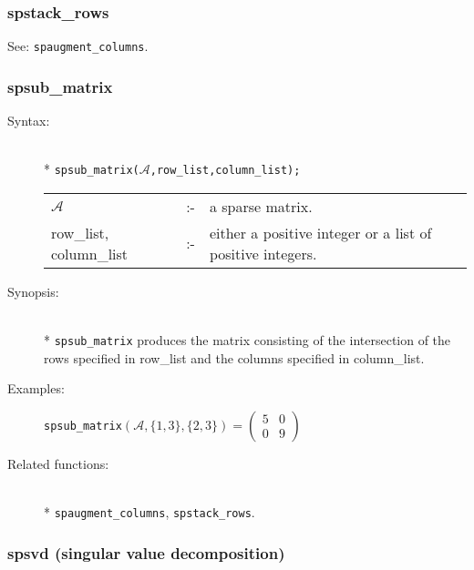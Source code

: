 \subsubsection{spstack\_rows}
\label{sparse:spstack_rows}
\hypertarget{operator:SPSTACK_ROWS}{}

See: \texttt{spaugment\_columns}.


\subsubsection{spsub\_matrix}
\label{sparse:spsub_matrix}
\hypertarget{operator:SPSUB_MATRIX}{}

\begin{description}
\item[Syntax:]\mbox{}\\*
\texttt{spsub\_matrix($\mathcal{A}$,row\_list,column\_list);}\\[2mm]
\begin{tabular}{l l l}
$\mathcal{A}$              &:-& a sparse matrix. \\
row\_list, column\_list &:-& \parbox[t]{.605\linewidth}{either a
positive integer or a list of positive integers.}
\end{tabular}

\item[Synopsis:]\mbox{}\\*
\texttt{spsub\_matrix} produces the matrix consisting of the
              intersection of the rows specified in row\_list and the
columns specified in column\_list.

\item[Examples:]
\hspace*{0.1in}
\texttt{spsub\_matrix}\((\mathcal{A},\{1,3\},\{2,3\}) =
        \begin{pmatrix} 5 & 0\\ 0 & 9 \end{pmatrix}\)

\item[Related functions:]\mbox{}\\*
\texttt{spaugment\_columns}, \texttt{spstack\_rows}.
\end{description}

\subsubsection{spsvd (singular value decomposition)}
\label{sparse:spsvd}
\hypertarget{operator:SPSVD}{}

